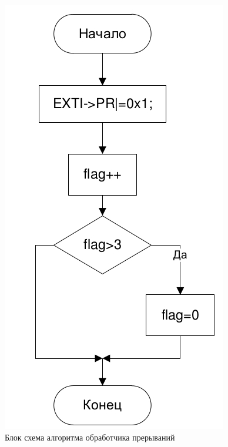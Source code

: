 \begin{figure}[H]
\begin{center}
\includegraphics[scale=0.4]{Image/90.jpg} 
\end{center}
\caption{Блок схема алгоритма обработчика прерываний}
\end{figure}


